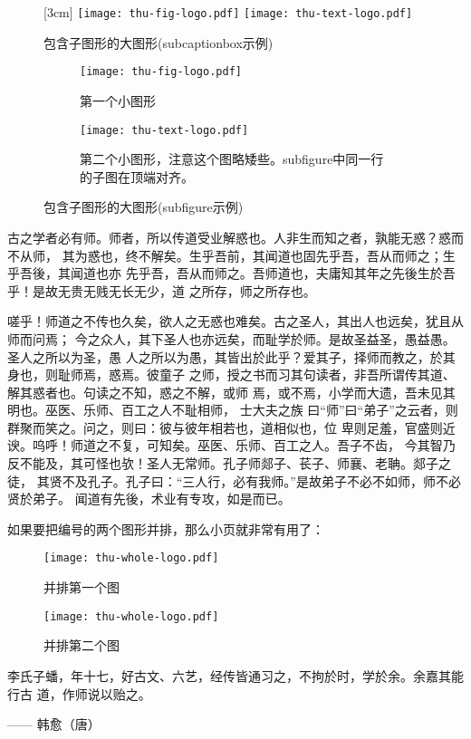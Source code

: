 \begin{figure}[h]
  \centering%
  [3cm] %
    {\texttt{[image: thu-fig-logo.pdf]}}%
  \hspace{4em}%
      {\texttt{[image: thu-text-logo.pdf]}}
  \caption{包含子图形的大图形(subcaptionbox示例)}
  \label{fig:big1-subcaptionbox}
\end{figure}
\begin{figure}[h]
  \centering%
  \begin{subfigure}{3cm}
    \texttt{[image: thu-fig-logo.pdf]}
    \caption{第一个小图形}
  \end{subfigure}%
  \hspace{4em}%
  \begin{subfigure}{0.5\textwidth}
    \texttt{[image: thu-text-logo.pdf]}
    \caption{第二个小图形，注意这个图略矮些。subfigure中同一行的子图在顶端对齐。}
  \end{subfigure}
  \caption{包含子图形的大图形(subfigure示例)}
  \label{fig:big1-subfigure}
\end{figure}

古之学者必有师。师者，所以传道受业解惑也。人非生而知之者，孰能无惑？惑而不从师，
其为惑也，终不解矣。生乎吾前，其闻道也固先乎吾，吾从而师之；生乎吾後，其闻道也亦
先乎吾，吾从而师之。吾师道也，夫庸知其年之先後生於吾乎！是故无贵无贱无长无少，道
之所存，师之所存也。

嗟乎！师道之不传也久矣，欲人之无惑也难矣。古之圣人，其出人也远矣，犹且从师而问焉；
今之众人，其下圣人也亦远矣，而耻学於师。是故圣益圣，愚益愚。圣人之所以为圣，愚
人之所以为愚，其皆出於此乎？爱其子，择师而教之，於其身也，则耻师焉，惑焉。彼童子
之师，授之书而习其句读者，非吾所谓传其道、解其惑者也。句读之不知，惑之不解，或师
焉，或不焉，小学而大遗，吾未见其明也。巫医、乐师、百工之人不耻相师，  士大夫之族
曰“师”曰“弟子”之云者，则群聚而笑之。问之，则曰：彼与彼年相若也，道相似也，位
卑则足羞，官盛则近谀。呜呼！师道之不复，可知矣。巫医、乐师、百工之人。吾子不齿，
今其智乃反不能及，其可怪也欤！圣人无常师。孔子师郯子、苌子、师襄、老聃。郯子之徒，
其贤不及孔子。孔子曰：“三人行，必有我师。”是故弟子不必不如师，师不必贤於弟子。
闻道有先後，术业有专攻，如是而已。

如果要把编号的两个图形并排，那么小页就非常有用了：
\begin{figure}
\begin{minipage}{0.48\textwidth}
  \centering
  \texttt{[image: thu-whole-logo.pdf]}
  \caption{并排第一个图}
  \label{fig:parallel1}
\end{minipage}\hfill
\begin{minipage}{0.48\textwidth}
  \centering
  \texttt{[image: thu-whole-logo.pdf]}
  \caption{并排第二个图}
  \label{fig:parallel2}
\end{minipage}
\end{figure}

李氏子蟠，年十七，好古文、六艺，经传皆通习之，不拘於时，学於余。余嘉其能行古
道，作师说以贻之。

\hfill —— 韩愈（唐）
